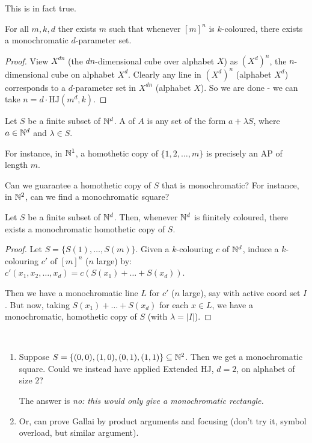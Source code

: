 \documentclass[10pt]{article}
\newcommand{\hj}{\textrm{HJ}}
\begin{document}
This is in fact true.

\begin{theorem}
    For all $m,k,d$ ther exists $m$ such that whenever $[m]^{n}$ is $k$-coloured, there exists a monochromatic $d$-parameter set.
\end{theorem}
\begin{proof}
    View $X^{dn}$ (the $dn$-dimensional cube over alphabet $X$) as $(X^d)^n$, the $n$-dimensional cube on alphabet $X^d$. Clearly any line in $(X^d)^n$ (alphabet $X^d$) corresponds to a $d$-parameter set in $X^{dn}$ (alphabet $X$). So we are done - we can take $n = d\cdot \hj(m^d,k)$.
\end{proof}

Let $S$ be a finite subset of $\mathbb{N}^d$. A  of $A$ is any set of the form $a + \lambda S$, where $a \in \mathbb{N}^d$ and $\lambda \in S$.

For instance, in $\mathbb{N}^1$, a homothetic copy of $\{1,2,\dots,m\}$ is precisely an AP of length $m$.

Can we guarantee a homothetic copy of $S$ that is monochromatic? For instance, in $\mathbb{N}^2$, can we find a monochromatic square?

\begin{theorem}
    Let $S$ be a finite subset of $\mathbb{N}^d$. Then, whenever $\mathbb{N}^d$ is fiinitely coloured, there exists a monochromatic homothetic copy of $S$.
\end{theorem}
\begin{proof}
    Let $S = \{S(1),\dots,S(m)\}$. Given a $k$-colouring $c$ of $\mathbb{N}^d$, induce a $k$-colouring $c'$ of $[m]^n$ ($n$ large) by: $c'(x_1,x_2,\dots,x_d) = c(S(x_1)+\dots + S(x_d))$.

    Then we have a monochromatic line $L$ for $c'$ ($n$ large), say with active coord set $I$. But now, taking $S(x_1)+\dots + S(x_d)$ for each $x \in L$, we have a monochromatic, homothetic copy of $S$ (with $\lambda = |I|$).
\end{proof}
\begin{remark*}[Remarks]\ 
    \begin{enumerate}
        \item Suppose $S = \{(0,0),(1,0),(0,1),(1,1)\} \subseteq \mathbb{N}^2$. Then we get a monochromatic square. Could we instead have applied Extended HJ, $d = 2$, on alphabet of size $2$?
        
        The answer is \it{no}: this would only give a monochromatic rectangle.

        \item Or, can prove Gallai by product arguments and focusing (don't try it, symbol overload, but similar argument).
    \end{enumerate}
\end{remark*}
\end{document}
